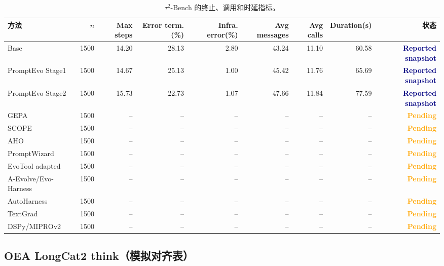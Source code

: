 \documentclass[a4paper,11pt]{article}
\newcommand{\reported}{\textcolor{navy}{\textbf{Reported snapshot}}}
\newcommand{\pending}{\textcolor{orange}{\textbf{Pending}}}
\begin{document}
\begin{CJK*}{UTF8}{gbsn}
\begin{table}[H]
\centering\scriptsize
\caption{$\tau^2$-Bench 的终止、调用和时延指标。}
\begin{adjustbox}{max width=\textwidth}
\begin{tabular}{lrrrrrrrr}
\toprule
方法 & $n$ & Max steps & Error term.(\%) & Infra. error(\%) & Avg messages & Avg calls & Duration(s) & 状态\\
\midrule
Base & 1500 & 14.20 & 28.13 & 2.80 & 43.24 & 11.10 & 60.58 & \reported\\
PromptEvo Stage1 & 1500 & 14.67 & 25.13 & 1.00 & 45.42 & 11.76 & 65.69 & \reported\\
PromptEvo Stage2 & 1500 & 15.73 & 22.73 & 1.07 & 47.66 & 11.84 & 77.59 & \reported\\
GEPA & 1500 & -- & -- & -- & -- & -- & -- & \pending\\
SCOPE & 1500 & -- & -- & -- & -- & -- & -- & \pending\\
AHO & 1500 & -- & -- & -- & -- & -- & -- & \pending\\
PromptWizard & 1500 & -- & -- & -- & -- & -- & -- & \pending\\
EvoTool adapted & 1500 & -- & -- & -- & -- & -- & -- & \pending\\
A-Evolve/Evo-Harness & 1500 & -- & -- & -- & -- & -- & -- & \pending\\
AutoHarness & 1500 & -- & -- & -- & -- & -- & -- & \pending\\
TextGrad & 1500 & -- & -- & -- & -- & -- & -- & \pending\\
DSPy/MIPROv2 & 1500 & -- & -- & -- & -- & -- & -- & \pending\\
\bottomrule
\end{tabular}
\end{adjustbox}
\end{table}
\fi

\subsection{OEA LongCat2 think（模拟对齐表）}


\end{CJK*}
\end{document}
